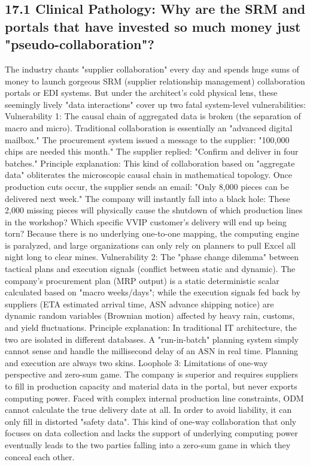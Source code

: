 \documentclass[11pt,a4paper]{article}
\begin{document}
\subsection*{17.1 Clinical Pathology: Why are the SRM and portals that have invested so much money just "pseudo-collaboration"?}


The industry chants "supplier collaboration" every day and spends huge sums of money to launch gorgeous SRM (supplier relationship management) collaboration portals or EDI systems. But under the architect's cold physical lens, these seemingly lively "data interactions" cover up two fatal system-level vulnerabilities: Vulnerability 1: The causal chain of aggregated data is broken (the separation of macro and micro). Traditional collaboration is essentially an "advanced digital mailbox." The procurement system issued a message to the supplier: "100,000 chips are needed this month." The supplier replied: "Confirm and deliver in four batches." Principle explanation: This kind of collaboration based on "aggregate data" obliterates the microscopic causal chain in mathematical topology. Once production cuts occur, the supplier sends an email: "Only 8,000 pieces can be delivered next week." The company will instantly fall into a black hole: These 2,000 missing pieces will physically cause the shutdown of which production lines in the workshop? Which specific VVIP customer’s delivery will end up being torn? Because there is no underlying one-to-one mapping, the computing engine is paralyzed, and large organizations can only rely on planners to pull Excel all night long to clear mines. Vulnerability 2: The "phase change dilemma" between tactical plans and execution signals (conflict between static and dynamic). The company's procurement plan (MRP output) is a static deterministic scalar calculated based on "macro weeks/days"; while the execution signals fed back by suppliers (ETA estimated arrival time, ASN advance shipping notice) are dynamic random variables (Brownian motion) affected by heavy rain, customs, and yield fluctuations. Principle explanation: In traditional IT architecture, the two are isolated in different databases. A "run-in-batch" planning system simply cannot sense and handle the millisecond delay of an ASN in real time. Planning and execution are always two skins. Loophole 3: Limitations of one-way perspective and zero-sum game. The company is superior and requires suppliers to fill in production capacity and material data in the portal, but never exports computing power. Faced with complex internal production line constraints, ODM cannot calculate the true delivery date at all. In order to avoid liability, it can only fill in distorted "safety data". This kind of one-way collaboration that only focuses on data collection and lacks the support of underlying computing power eventually leads to the two parties falling into a zero-sum game in which they conceal each other.
\end{document}
